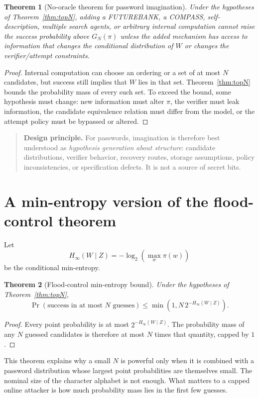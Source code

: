 \documentclass[11pt,openany]{book}
\newtheorem{theorem}{Theorem}[chapter]
\theoremstyle{definition}
\theoremstyle{remark}
\newenvironment{designbox}{\begin{quote}\small\color{green!35!black}\textbf{Design principle.} }{\end{quote}}
\begin{document}
\begin{theorem}[No-oracle theorem for password imagination]\label{thm:nooracle}
Under the hypotheses of Theorem~\ref{thm:topN}, adding a FUTUREBANK, a COMPASS, self-description, multiple search agents, or arbitrary internal computation cannot raise the success probability above $G_N(\pi)$ unless the added mechanism has access to information that changes the conditional distribution of $W$ or changes the verifier/attempt constraints.
\end{theorem}
\begin{proof}
Internal computation can choose an ordering or a set of at most $N$ candidates, but success still implies that $W$ lies in that set. Theorem~\ref{thm:topN} bounds the probability mass of every such set. To exceed the bound, some hypothesis must change: new information must alter $\pi$, the verifier must leak information, the candidate equivalence relation must differ from the model, or the attempt policy must be bypassed or altered.
\end{proof}

\begin{designbox}
For passwords, imagination is therefore best understood as \emph{hypothesis generation about structure}: candidate distributions, verifier behavior, recovery routes, storage assumptions, policy inconsistencies, or specification defects. It is not a source of secret bits.
\end{designbox}

\section{A min-entropy version of the flood-control theorem}
Let
\[
H_\infty(W\mid Z)=-\log_2\left(\max_w \pi(w)\right)
\]
be the conditional min-entropy.

\begin{theorem}[Flood-control min-entropy bound]\label{thm:minentropy}
Under the hypotheses of Theorem~\ref{thm:topN},
\[
\Pr(\text{success in at most }N\text{ guesses})
\le
\min\left(1,N\,2^{-H_\infty(W\mid Z)}\right).
\]
\end{theorem}
\begin{proof}
Every point probability is at most $2^{-H_\infty(W\mid Z)}$. The probability mass of any $N$ guessed candidates is therefore at most $N$ times that quantity, capped by $1$.
\end{proof}

This theorem explains why a small $N$ is powerful only when it is combined with a password distribution whose largest point probabilities are themselves small. The nominal size of the character alphabet is not enough. What matters to a capped online attacker is how much probability mass lies in the first few guesses.
\end{document}
